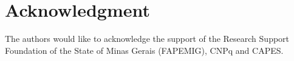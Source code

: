 \documentclass[conference]{IEEEtran}
\begin{document}




\section*{Acknowledgment}
The authors would like to acknowledge the support of the Research Support Foundation of the
State of Minas Gerais (FAPEMIG), CNPq and CAPES.


\balance

\end{document}
